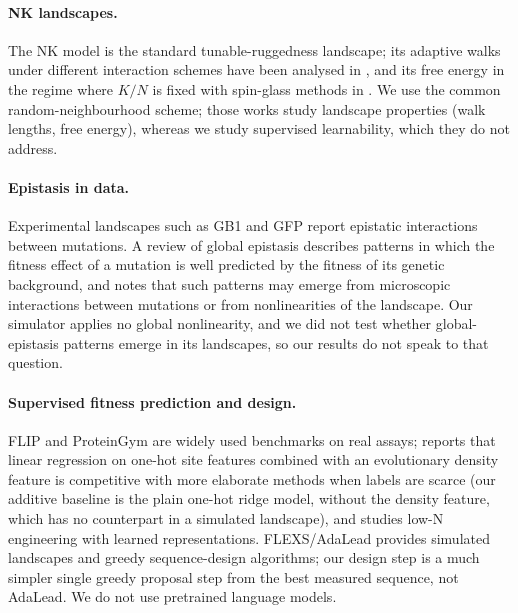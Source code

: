 \paragraph{NK landscapes.} The NK model \cite{kauffman1989nk} is the standard tunable-ruggedness landscape; its adaptive walks under different interaction schemes have been analysed in \cite{nowak2015analysis}, and its free energy in the regime where $K/N$ is fixed with spin-glass methods in \cite{chen2025fitness}. We use the common random-neighbourhood scheme; those works study landscape properties (walk lengths, free energy), whereas we study supervised learnability, which they do not address.

\paragraph{Epistasis in data.} Experimental landscapes such as GB1 \cite{wu2016adaptation} and GFP \cite{sarkisyan2016local} report epistatic interactions between mutations. A review of global epistasis \cite{diazcolunga2022global} describes patterns in which the fitness effect of a mutation is well predicted by the fitness of its genetic background, and notes that such patterns may emerge from microscopic interactions between mutations or from nonlinearities of the landscape. Our simulator applies no global nonlinearity, and we did not test whether global-epistasis patterns emerge in its landscapes, so our results do not speak to that question.

\paragraph{Supervised fitness prediction and design.} FLIP \cite{dallago2021flip} and ProteinGym \cite{notin2023proteingym} are widely used benchmarks on real assays; \cite{hsu2022learning} reports that linear regression on one-hot site features combined with an evolutionary density feature is competitive with more elaborate methods when labels are scarce (our additive baseline is the plain one-hot ridge model, without the density feature, which has no counterpart in a simulated landscape), and \cite{biswas2020low} studies low-N engineering with learned representations. FLEXS/AdaLead \cite{sinai2020adalead} provides simulated landscapes and greedy sequence-design algorithms; our design step is a much simpler single greedy proposal step from the best measured sequence, not AdaLead. We do not use pretrained language models.
